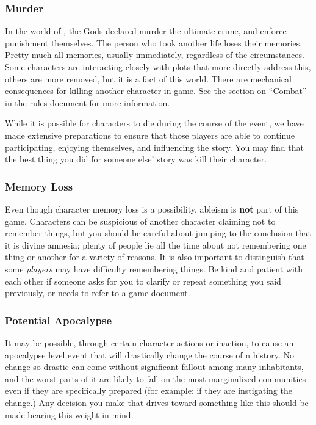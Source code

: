 \documentclass[sheet]{PP}
\begin{document}
\subsubsection{Murder}
In the world of \pEarth{}, the Gods declared murder the ultimate crime, and enforce punishment themselves. The person who took another life loses their memories. Pretty much all memories, usually immediately, regardless of the circumstances. Some characters are interacting closely with plots that more directly address this, others are more removed, but it is a fact of this world. There are mechanical consequences for killing another character in game. See the section on ``Combat'' in the rules document for more information.

While it is possible for characters to die during the course of the event, we have made extensive preparations to ensure that those players are able to continue participating, enjoying themselves, and influencing the story. You may find that the best thing you did for someone else' story was kill their character.

\subsubsection{Memory Loss}
Even though character memory loss is a possibility, ableism is \textbf{not} part of this game. Characters can be suspicious of another character claiming not to remember things, but you should be careful about jumping to the conclusion that it is divine amnesia; plenty of people lie all the time about not remembering one thing or another for a variety of reasons. It is also important to distinguish that some \emph{players} may have difficulty remembering things. Be kind and patient with each other if someone asks for you to clarify or repeat something you said previously, or needs to refer to a game document.

\subsubsection{Potential Apocalypse}
It may be possible, through certain character actions or inaction, to cause an apocalypse level event that will drastically change the course of \pEarth{}n history. No change so drastic can come without significant fallout among many inhabitants, and the worst parts of it are likely to fall on the most marginalized communities even if they are specifically prepared (for example: if they are instigating the change.) Any decision you make that drives toward something like this should be made bearing this weight in mind.
\end{document}
